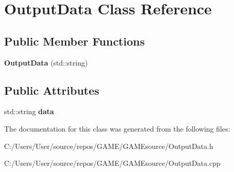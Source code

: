 \hypertarget{class_output_data}{}\section{Output\+Data Class Reference}
\label{class_output_data}
\subsection*{Public Member Functions}
\begin{DoxyCompactItemize}
\item 
\mbox{\label{class_output_data_a66eec456c0579b9945a412bb919f8f08}} 
{\bfseries Output\+Data} (std\+::string)
\end{DoxyCompactItemize}
\subsection*{Public Attributes}
\begin{DoxyCompactItemize}
\item 
\mbox{\label{class_output_data_aea2c1c5aff5523a159a410ff0e06b6fa}} 
std\+::string {\bfseries data}
\end{DoxyCompactItemize}


The documentation for this class was generated from the following files\+:\begin{DoxyCompactItemize}
\item 
C\+:/\+Users/\+User/source/repos/\+G\+A\+M\+E/\+G\+A\+M\+Esource/Output\+Data.\+h\item 
C\+:/\+Users/\+User/source/repos/\+G\+A\+M\+E/\+G\+A\+M\+Esource/Output\+Data.\+cpp\end{DoxyCompactItemize}
